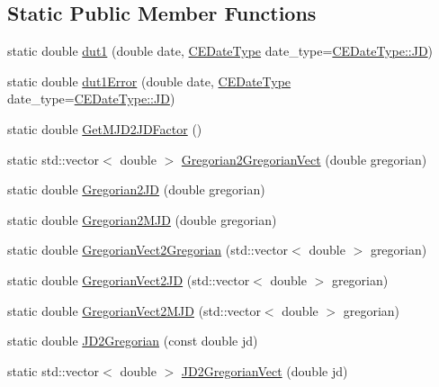 \subsection*{Static Public Member Functions}
\begin{DoxyCompactItemize}
\item 
static double \hyperlink{class_c_e_date_a48ed1e949856bdc1f735d5682ad90b13}{dut1} (double date, \hyperlink{_c_e_date_8h_aa6b826beca26b0712061a4afc5ad7746}{C\+E\+Date\+Type} date\+\_\+type=\hyperlink{_c_e_date_8h_aa6b826beca26b0712061a4afc5ad7746aabf8d7515962e526421842e8456798cc}{C\+E\+Date\+Type\+::\+J\+D})
\item 
static double \hyperlink{class_c_e_date_a3b7b48a1fb897f1a97650551a56ea74e}{dut1\+Error} (double date, \hyperlink{_c_e_date_8h_aa6b826beca26b0712061a4afc5ad7746}{C\+E\+Date\+Type} date\+\_\+type=\hyperlink{_c_e_date_8h_aa6b826beca26b0712061a4afc5ad7746aabf8d7515962e526421842e8456798cc}{C\+E\+Date\+Type\+::\+J\+D})
\item 
static double \hyperlink{class_c_e_date_ad3e980e8803ecc0671222ba662bdc7d8}{Get\+M\+J\+D2\+J\+D\+Factor} ()
\item 
static std\+::vector$<$ double $>$ \hyperlink{class_c_e_date_a0d1bc6ed26cc38c4bbbe22953a9eb5bf}{Gregorian2\+Gregorian\+Vect} (double gregorian)
\item 
static double \hyperlink{class_c_e_date_ae9fd46001251867c9f5cf936b18ba629}{Gregorian2\+J\+D} (double gregorian)
\item 
static double \hyperlink{class_c_e_date_ab9928a115235a59b2e4c210922bd3a86}{Gregorian2\+M\+J\+D} (double gregorian)
\item 
static double \hyperlink{class_c_e_date_aa0fcbac9957aeb66d1fad1008ccdbac3}{Gregorian\+Vect2\+Gregorian} (std\+::vector$<$ double $>$ gregorian)
\item 
static double \hyperlink{class_c_e_date_aea89e8524c94bcfa9d1a352ec437f084}{Gregorian\+Vect2\+J\+D} (std\+::vector$<$ double $>$ gregorian)
\item 
static double \hyperlink{class_c_e_date_a527a939f24d47becef7fdeaf1f51bcd9}{Gregorian\+Vect2\+M\+J\+D} (std\+::vector$<$ double $>$ gregorian)
\item 
static double \hyperlink{class_c_e_date_af699560be178f1ffbf9f9aae444085ad}{J\+D2\+Gregorian} (const double jd)
\item 
static std\+::vector$<$ double $>$ \hyperlink{class_c_e_date_a4dbfe2ea3d5083c90602baa2b3003587}{J\+D2\+Gregorian\+Vect} (double jd)
\item 

\end{DoxyCompactItemize}
